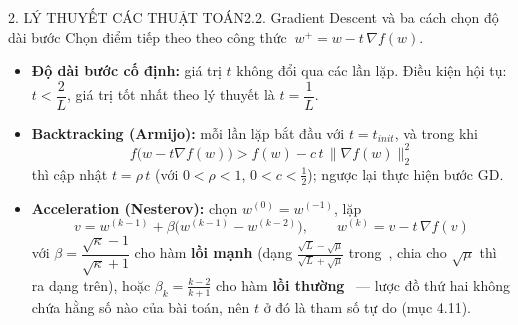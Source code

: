 \documentclass[aspectratio=169,11pt]{beamer}
\newcommand{\norm}[1]{\lVert #1 \rVert}
\begin{document}
\begin{frame}{2. LÝ THUYẾT CÁC THUẬT TOÁN}{2.2. Gradient Descent và ba cách chọn độ dài bước}
  \small
  Chọn điểm tiếp theo theo công thức $\ w^{+}=w-t\,\nabla f(w)$.
  \vspace{4pt}
  \begin{itemize}
    \item \textbf{Độ dài bước cố định:} giá trị $t$ không đổi qua các lần lặp. Điều kiện hội tụ:
          $t<\dfrac{2}{L}$, giá trị tốt nhất theo lý thuyết là $t=\dfrac1L$.
    \item \textbf{Backtracking (Armijo):} mỗi lần lặp bắt đầu với $t=t_{init}$, và trong khi
          \[
            f\big(w-t\nabla f(w)\big)>f(w)-c\,t\,\norm{\nabla f(w)}_2^2
          \]
          thì cập nhật $t=\rho\,t$ (với $0<\rho<1$, $0<c<\tfrac12$); ngược lại thực hiện bước GD.
    \item \textbf{Acceleration (Nesterov):} chọn $w^{(0)}=w^{(-1)}$, lặp
          \[
            v=w^{(k-1)}+\beta\big(w^{(k-1)}-w^{(k-2)}\big),\qquad
            w^{(k)}=v-t\,\nabla f(v)
          \]
          với $\beta=\dfrac{\sqrt\kappa-1}{\sqrt\kappa+1}$ cho hàm \textbf{lồi mạnh}
          (dạng $\frac{\sqrt L-\sqrt\mu}{\sqrt L+\sqrt\mu}$ trong~\cite{nesterov2018lectures},
          chia cho $\sqrt\mu$ thì ra dạng trên), hoặc $\beta_k=\tfrac{k-2}{k+1}$ cho hàm
          \textbf{lồi thường}~\cite{beck2009fista} --- lược đồ thứ hai không chứa hằng số nào của
          bài toán, nên $t$ ở đó là tham số tự do (mục 4.11).
  \end{itemize}
\end{frame}
\end{document}
